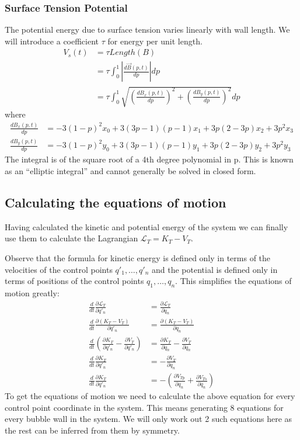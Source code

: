 \documentclass{article}
\begin{document}
\subsubsection{Surface Tension Potential}
The potential energy due to surface tension varies linearly with wall length. We
will introduce a coefficient $\tau$ for energy per unit length.
\begin{align}
V_s(t)&=\tau Length(B)\\
&=\tau \int_0^1 \left|\frac{d \vec{B}(p,t)}{dp}\right| dp \nonumber\\
&=\tau \int_0^1 \sqrt{\left(\frac{d B_x(p,t)}{dp}\right)^2+\left(\frac{d
B_y(p,t)}{dp}\right)^2} dp \nonumber
\end{align}
where
\begin{align*}
\frac{d B_x(p,t)}{dp}&= -3(1-p)^2x_0 +3(3p-1) (p-1)x_1+3p(2-3p)x_2 +3p^2x_3\\
\frac{d B_y(p,t)}{dp}&= -3(1-p)^2y_0 +3(3p-1) (p-1)y_1+3p(2-3p)y_2 +3p^2y_3
\end{align*}
The integral is of the square root of a 4th degree polynomial in p. This is
known as an ``elliptic integral'' and cannot generally be solved in closed
form.
\subsection{Calculating the equations of motion}
Having calculated the kinetic and potential energy of the system we can finally
use them to calculate the Lagrangian $\mathcal{L}_T=K_T-V_T$.

Observe that the formula for kinetic energy is defined only in terms of
the velocities of the control points $q'_1,\dots,q'_n$ and the potential is
defined only in terms of positions of the control points $q_1,\dots,q_n$.
This simplifies the equations of motion greatly:
\begin{align*}
\frac{d}{d t}\frac{\partial \mathcal{L}_T}{\partial q'_n} 
&=\frac{\partial \mathcal{L}_T}{\partial q_n} \\
\frac{d}{d t}\frac{\partial (K_T-V_T)}{\partial q'_n}
&= \frac{\partial (K_T-V_T)}{\partial q_n} \\
\frac{d}{d t}\left( \frac{\partial K_T}{\partial q'_n} - \frac{\partial
V_T}{\partial q'_n}\right)
&=\frac{\partial K_T}{\partial q_n}-\frac{\partial V_T}{\partial q_n} \\
\frac{d}{d t} \frac{\partial K_T}{\partial q'_n}
&=-\frac{\partial V_T}{\partial q_n}\\
\frac{d}{d t} \frac{\partial K_T}{\partial q'_n}
&= -\left(\frac{\partial V_{Tp}}{\partial q_n}+\frac{\partial V_{Ts}}{\partial
q_n}\right)
\end{align*}
To get the equations of motion we need to calculate the above equation for every
control point coordinate in the system. This means generating 8 equations for
every bubble wall in the system. We will only work out 2 such equations here as
the rest can be inferred from them by symmetry.
\end{document}
